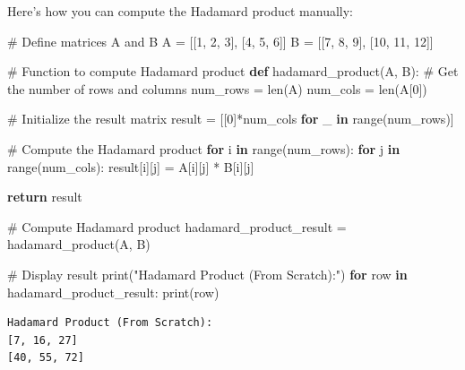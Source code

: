 \documentclass[
  letterpaper,
  DIV=11,
  numbers=noendperiod]{scrreprt}
\newenvironment{Shaded}{\begin{snugshade}}{\end{snugshade}}
\newcommand{\BuiltInTok}[1]{\textcolor[rgb]{0.00,0.23,0.31}{#1}}
\newcommand{\CommentTok}[1]{\textcolor[rgb]{0.37,0.37,0.37}{#1}}
\newcommand{\ControlFlowTok}[1]{\textcolor[rgb]{0.00,0.23,0.31}{\textbf{#1}}}
\newcommand{\DecValTok}[1]{\textcolor[rgb]{0.68,0.00,0.00}{#1}}
\newcommand{\KeywordTok}[1]{\textcolor[rgb]{0.00,0.23,0.31}{\textbf{#1}}}
\newcommand{\NormalTok}[1]{\textcolor[rgb]{0.00,0.23,0.31}{#1}}
\newcommand{\OperatorTok}[1]{\textcolor[rgb]{0.37,0.37,0.37}{#1}}
\newcommand{\StringTok}[1]{\textcolor[rgb]{0.13,0.47,0.30}{#1}}
\theoremstyle{plain}
\theoremstyle{definition}
\theoremstyle{remark}
\begin{document}
Here's how you can compute the Hadamard product manually:

\begin{Shaded}
\begin{Highlighting}[]
\CommentTok{\# Define matrices A and B}
\NormalTok{A }\OperatorTok{=}\NormalTok{ [[}\DecValTok{1}\NormalTok{, }\DecValTok{2}\NormalTok{, }\DecValTok{3}\NormalTok{], [}\DecValTok{4}\NormalTok{, }\DecValTok{5}\NormalTok{, }\DecValTok{6}\NormalTok{]]}
\NormalTok{B }\OperatorTok{=}\NormalTok{ [[}\DecValTok{7}\NormalTok{, }\DecValTok{8}\NormalTok{, }\DecValTok{9}\NormalTok{], [}\DecValTok{10}\NormalTok{, }\DecValTok{11}\NormalTok{, }\DecValTok{12}\NormalTok{]]}

\CommentTok{\# Function to compute Hadamard product}
\KeywordTok{def}\NormalTok{ hadamard\_product(A, B):}
    \CommentTok{\# Get the number of rows and columns}
\NormalTok{    num\_rows }\OperatorTok{=} \BuiltInTok{len}\NormalTok{(A)}
\NormalTok{    num\_cols }\OperatorTok{=} \BuiltInTok{len}\NormalTok{(A[}\DecValTok{0}\NormalTok{])}
    
    \CommentTok{\# Initialize the result matrix}
\NormalTok{    result }\OperatorTok{=}\NormalTok{ [[}\DecValTok{0}\NormalTok{]}\OperatorTok{*}\NormalTok{num\_cols }\ControlFlowTok{for}\NormalTok{ \_ }\KeywordTok{in} \BuiltInTok{range}\NormalTok{(num\_rows)]}
    
    \CommentTok{\# Compute the Hadamard product}
    \ControlFlowTok{for}\NormalTok{ i }\KeywordTok{in} \BuiltInTok{range}\NormalTok{(num\_rows):}
        \ControlFlowTok{for}\NormalTok{ j }\KeywordTok{in} \BuiltInTok{range}\NormalTok{(num\_cols):}
\NormalTok{            result[i][j] }\OperatorTok{=}\NormalTok{ A[i][j] }\OperatorTok{*}\NormalTok{ B[i][j]}
    
    \ControlFlowTok{return}\NormalTok{ result}

\CommentTok{\# Compute Hadamard product}
\NormalTok{hadamard\_product\_result }\OperatorTok{=}\NormalTok{ hadamard\_product(A, B)}

\CommentTok{\# Display result}
\BuiltInTok{print}\NormalTok{(}\StringTok{"Hadamard Product (From Scratch):"}\NormalTok{)}
\ControlFlowTok{for}\NormalTok{ row }\KeywordTok{in}\NormalTok{ hadamard\_product\_result:}
    \BuiltInTok{print}\NormalTok{(row)}
\end{Highlighting}
\end{Shaded}

\begin{verbatim}
Hadamard Product (From Scratch):
[7, 16, 27]
[40, 55, 72]
\end{verbatim}
\end{document}
